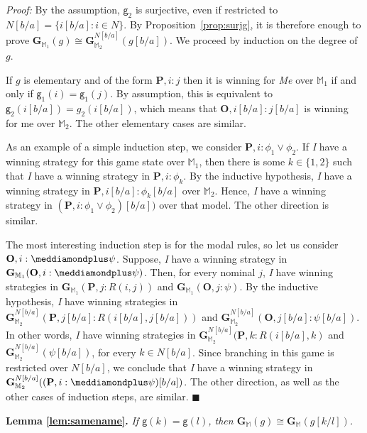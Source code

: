 \documentclass{easychair}
\newcommand{\I}{\emph{I}\xspace}
\newcommand{\Me}{\emph{Me}\xspace}
\newcommand{\g}{\mathsf{g}}
\renewcommand{\qed}{\hfill$\blacksquare$}
\renewenvironment{proof}{\noindent\textit{Proof:}\quad}{\qed}
\newcommand{\dplus}{\meddiamondplus}
\begin{document}
\begin{proof}
By the assumption, $\g_2$ is surjective, even if restricted to
$N[b/a]=\{i[b/a]:i\in N\}$. By Proposition~\ref{prop:surjg}, it is therefore
enough to prove $\mathbf{G}_{\mathbb{M}_1}(g)\cong
\mathbf{G}^{N[b/a]}_{\mathbb{M}_2}(g[b/a])$. We proceed by  
induction on the degree of $g$.

If $g$ is elementary and of the form $\mathbf{P}, i: j$ then it is winning for \Me over $\mathbb{M}_1$ if and only if $\g_1(i) = \g_1(j)$. By assumption, this is equivalent to $\g_2(i[b/a])=g_2(i[b/a])$, which means that $\mathbf{O},i[b/a]:j[b/a]$ is winning for me over $\mathbb{M}_2$. The other elementary cases are similar.

As an example of a simple induction step, we consider $\mathbf{P},i:\phi_1 \vee
\phi_2$. If \I have a winning strategy for this game state over
$\mathbb{M}_1$, then there is some $k\in \{1,2\}$ such that \I have a winning
strategy in $\mathbf{P},i:\phi_k$. By the inductive hypothesis, \I have a
winning strategy in $\mathbf{P},i[b/a]:\phi_k[b/a]$ over $\mathbb{M}_2$. Hence,
\I have a winning strategy in $(\mathbf{P},i:\phi_1 \vee \phi_2)[b/a])$ over
that model. The other direction is similar.

The most interesting induction step is for the modal rules, so let us consider
$\mathbf{O},i:\dplus \psi$. Suppose, \I have a winning strategy in
$\mathbf{G}_{\mathbb{M}_1}(\mathbf{O},i:\dplus \psi)$. Then, for every nominal
$j$, \I have winning strategies in
$\mathbf{G}_{\mathbb{M}_1}(\mathbf{P},j:R(i,j))$ and
$\mathbf{G}_{\mathbb{M}_1}(\mathbf{O},j: \psi)$. By the inductive hypothesis, \I
have winning strategies in
$\mathbf{G}^{N[b/a]}_{\mathbb{M}_2}(\mathbf{P},j[b/a]:R(i[b/a],j[b/a]))$ and
$\mathbf{G}^{N[b/a]}_{\mathbb{M}_2}(\mathbf{O},j[b/a]: \psi[b/a])$. In other
words, \I have winning strategies in
$\mathbf{G}^{N[b/a]}_{\mathbb{M}_2}(\mathbf{P},k:R(i[b/a],k)$ and
$\mathbf{G}^{N[b/a]}_{\mathbb{M}_2}(\psi[b/a])$, for every $k\in N[b/a]$. Since
branching in this game is restricted over $N[b/a]$, we conclude that \I have a
winning strategy in
$\mathbf{G}^{N[b/a]}_{\mathbb{M}_2}((\mathbf{P},i:\dplus \psi)[b/a])$. The other
direction, as well as the other cases of induction steps, are similar.
\end{proof}

\bigskip

\noindent
{\bf Lemma \ref{lem:samename}.}
\textit{If $\g(k) = \g(l)$, then $\mathbf{G}_\mathbb{M}(g)\cong\mathbf{G}_\mathbb{M}(g[k/l])$.
}
\end{document}
